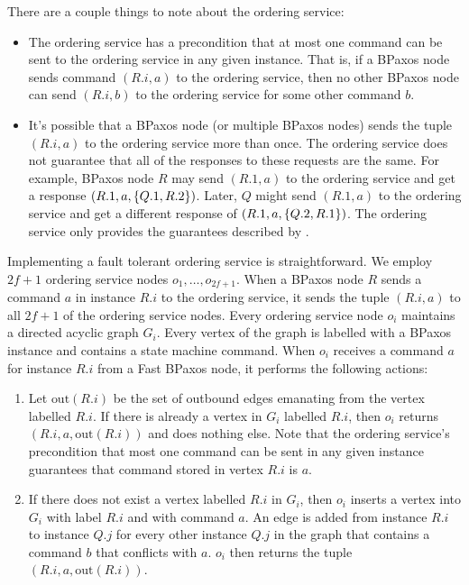 There are a couple things to note about the ordering service:
\begin{itemize}
  \item
    The ordering service has a precondition that at most one command can be
    sent to the ordering service in any given instance. That is, if a BPaxos
    node sends command $(R.i, a)$ to the ordering service, then no other BPaxos
    node can send $(R.i, b)$ to the ordering service for some other command
    $b$.

  \item
    It's possible that a BPaxos node (or multiple BPaxos nodes) sends the tuple
    $(R.i, a)$ to the ordering service more than once. The ordering service
    does not guarantee that all of the responses to these requests are the
    same.  For example, BPaxos node $R$ may send $(R.1, a)$ to the ordering
    service and get a response $(R.1, a, \{Q.1, R.2\})$. Later, $Q$ might
    send $(R.1, a)$ to the ordering service and get a different response of
    $(R.1, a, \{Q.2, R.1\})$. The ordering service only provides the
    guarantees described by .
\end{itemize}

\newcommand{\out}{\text{out}}
Implementing a fault tolerant ordering service is straightforward. We employ
$2f + 1$ ordering service nodes $o_{1}, \ldots, o_{2f + 1}$. When a BPaxos node
$R$ sends a command $a$ in instance $R.i$ to the ordering service, it sends the
tuple $(R.i, a)$ to all $2f + 1$ of the ordering service nodes. Every ordering
service node $o_i$ maintains a directed acyclic graph $G_i$. Every vertex of
the graph is labelled with a BPaxos instance and contains a state machine
command. When $o_i$ receives a command $a$ for instance $R.i$ from a Fast
BPaxos node, it performs the following actions:
\begin{enumerate}
  \item
    Let $\out(R.i)$ be the set of outbound edges emanating from the vertex
    labelled $R.i$. If there is already a vertex in $G_i$ labelled $R.i$, then
    $o_i$ returns $(R.i, a, \out(R.i))$ and does nothing else.  Note that the
    ordering service's precondition that most one command can be sent in any
    given instance guarantees that command stored in vertex $R.i$ is $a$.
  \item
    If there does not exist a vertex labelled $R.i$ in $G_i$, then $o_i$
    inserts a vertex into $G_i$ with label $R.i$ and with command $a$. An edge
    is added from instance $R.i$ to instance $Q.j$ for every other instance
    $Q.j$ in the graph that contains a command $b$ that conflicts with $a$.
    $o_i$ then returns the tuple $(R.i, a, \out(R.i))$.
\end{enumerate}

